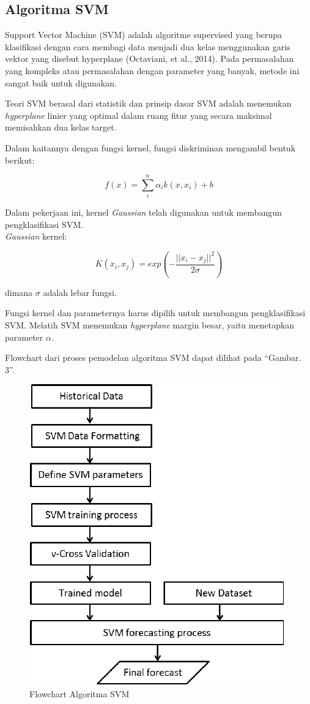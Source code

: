 \documentclass[conference]{IEEEtran}
\begin{document}
\subsection{Algoritma SVM}
Support Vector Machine (SVM) adalah algoritme supervised yang berupa klasifikasi dengan cara membagi data menjadi dua kelas menggunakan garis vektor yang disebut hyperplane (Octaviani, et al., 2014). Pada permasalahan yang kompleks atau permasalahan dengan parameter yang banyak, metode ini sangat baik untuk digunakan.

Teori SVM berasal dari statistik dan prinsip dasar SVM adalah menemukan \emph{hyperplane} linier yang optimal dalam ruang fitur yang secara maksimal memisahkan dua kelas target\cite{hasan}.

Dalam kaitannya dengan fungsi kernel, fungsi diskriminan mengambil bentuk berikut:

\begin{equation*}
f(x) = \sum^{n}_i \alpha_ik(x,x_i)+b
\label{eq4}
\end{equation*}

Dalam pekerjaan ini, kernel \emph{Gaussian} telah digunakan
untuk membangun pengklasifikasi SVM.\\ \emph{Gaussian} kernel:

\begin{equation*}
K(x_i,x_j) = exp\left (- \frac{||x_i-x_j||^2}{2\sigma} \right )
\label{eq5}
\end{equation*}

\noindent dimana $\sigma$ adalah lebar fungsi.

Fungsi kernel dan parameternya harus dipilih untuk membangun pengklasifikasi SVM. Melatih SVM menemukan \emph{hyperplane} margin besar, yaitu menetapkan parameter $\alpha$.

Flowchart dari proses pemodelan algoritma SVM dapat dilihat pada ``Gambar. 3''\cite{inproceedings}.\vspace{6pt}

\begin{figure}
\centering
\includegraphics[width=.4\textwidth]{Gambar/gambar2.png}
\caption{Flowchart Algoritma SVM}
\end{figure}
\end{document}
